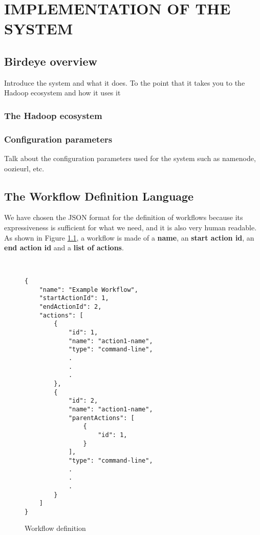 \chapter{IMPLEMENTATION OF THE SYSTEM}
\section{Birdeye overview}
Introduce the system and what it does. To the point that it takes you to the Hadoop ecosystem and
how it uses it
\subsection{The Hadoop ecosystem}
\subsection{Configuration parameters}
Talk about the configuration parameters used for the system such as namenode, oozieurl, etc.

\section{The Workflow Definition Language}
We have chosen the JSON format for the definition of workflows because its expressiveness is sufficient for what we need, and it is also very human readable. As shown in Figure \ref{fig:workflow_definition_language}, a workflow is made of a \textbf{name}, an \textbf{start action id}, an \textbf{end action id} and a \textbf{list of actions}. 

\begin{figure}
\begin{mdframed}
\begin{singlespace}
\begin{verbatim}


{
    "name": "Example Workflow",
    "startActionId": 1,
    "endActionId": 2,
    "actions": [
        {
            "id": 1,
            "name": "action1-name",
            "type": "command-line",
            .
            .
            .
        },
        {
            "id": 2,
            "name": "action1-name",
            "parentActions": [
                { 
                    "id": 1,
                }
            ],
            "type": "command-line",
            .
            .
            .
        }
    ]
}
\end{verbatim}
\end{singlespace}
\end{mdframed}
\caption{Workflow definition}
\label{fig:workflow_definition_language}
\end{figure}

